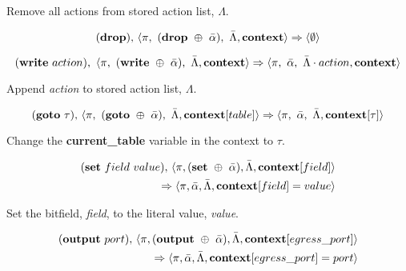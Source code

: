 Remove all actions from stored action list, $\Lambda$.

\begin{equation}  
  (\textrm{\textbf{drop})} \textrm{,} \ \langle \pi, \ (\textrm{\textbf{drop}} \ \oplus \ \bar \alpha), \ \bar \Lambda, \textbf{\textrm{context}} \rangle
  \Rightarrow \langle \emptyset \rangle
\end{equation}


\begin{equation}
  (\textrm{\textbf{write}} \ action), \ \langle \pi, \ (\textrm{\textbf{write}} \ \oplus \ \bar \alpha), \ \bar \Lambda,
  \textrm{\textbf{context}} \rangle \Rightarrow
  \langle \pi, \ \bar \alpha, \ \bar \Lambda \cdot action, \textrm{\textbf{context}} \rangle
\end{equation}

Append \textit{action} to stored action list, $\Lambda$.

\begin{equation}
  (\textrm{\textbf{goto}} \ \tau) \textrm{,} \ \langle \pi, \ (\textrm{\textbf{goto}} \ \oplus \ \bar \alpha), \ \bar \Lambda, \textrm{\textbf{context}}[table] \rangle
  \Rightarrow \langle \pi, \ \bar \alpha, \ \bar \Lambda, \textrm{\textbf{context}}[\tau] \rangle
\end{equation}

Change the \textbf{current\_table} variable in the context to $\tau$.

\begin{equation}
\begin{split}
  (\textrm{\textbf{set}} \ field \ value) \textrm{,} \ \langle \pi, (\textrm{\textbf{set}} \ \oplus \ \bar \alpha), \bar \Lambda,
  \textbf{\textrm{context}}[field] \rangle \\
  \Rightarrow \langle \pi, \bar \alpha, \bar \Lambda,
  \textbf{\textrm{context}}[field] = value \rangle
\end{split}
\end{equation}

Set the bitfield, \textit{field}, to the literal value, \textit{value}.

\begin{equation}
\begin{split}
  (\textrm{\textbf{output}} \ port) \textrm{,} \ \langle \pi, (\textrm{\textbf{output}} \ \oplus \ \bar \alpha), \bar \Lambda,
  \textbf{\textrm{context}}[egress\_port] \rangle \\
  \Rightarrow 
  \langle \pi, \bar \alpha, \bar \Lambda,
  \textbf{\textrm{context}}[egress\_port] = port \rangle
\end{split}
\end{equation}

